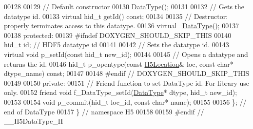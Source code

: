 \begin{DoxyCode}
00128 
00129         \textcolor{comment}{// Default constructor}
00130         \hyperlink{class_h5_1_1_data_type}{DataType}();
00131 
00132         \textcolor{comment}{// Gets the datatype id.}
00133         \textcolor{keyword}{virtual} hid\_t getId() \textcolor{keyword}{const};
00134 
00135         \textcolor{comment}{// Destructor: properly terminates access to this datatype.}
00136         \textcolor{keyword}{virtual} ~\hyperlink{class_h5_1_1_data_type}{DataType}();
00137 
00138    \textcolor{keyword}{protected}:
00139 \textcolor{preprocessor}{#ifndef DOXYGEN\_SHOULD\_SKIP\_THIS}
00140         hid\_t id;    \textcolor{comment}{// HDF5 datatype id}
00141 
00142         \textcolor{comment}{// Sets the datatype id.}
00143         \textcolor{keyword}{virtual} \textcolor{keywordtype}{void} p\_setId(\textcolor{keyword}{const} hid\_t new\_id);
00144 
00145         \textcolor{comment}{// Opens a datatype and returns the id.}
00146         hid\_t p\_opentype(\textcolor{keyword}{const} \hyperlink{class_h5_1_1_h5_location}{H5Location}& loc, \textcolor{keyword}{const} \textcolor{keywordtype}{char}* dtype\_name) \textcolor{keyword}{const};
00147 
00148 \textcolor{preprocessor}{#endif // DOXYGEN\_SHOULD\_SKIP\_THIS}
00149 
00150    \textcolor{keyword}{private}:
00151         \textcolor{comment}{// Friend function to set DataType id.  For library use only.}
00152         \textcolor{keyword}{friend} \textcolor{keywordtype}{void} f\_DataType\_setId(\hyperlink{class_h5_1_1_data_type}{DataType}* dtype, hid\_t new\_id);
00153 
00154         \textcolor{keywordtype}{void} p\_commit(hid\_t loc\_id, \textcolor{keyword}{const} \textcolor{keywordtype}{char}* name);
00155 
00156 \}; \textcolor{comment}{// end of DataType}
00157 \} \textcolor{comment}{// namespace H5}
00158 
00159 \textcolor{preprocessor}{#endif // \_\_H5DataType\_H}
\end{DoxyCode}
